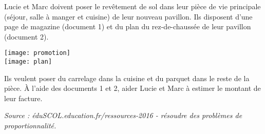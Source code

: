 \Recreation

   Lucie et Marc doivent poser le revêtement de sol dans leur pièce de vie principale (séjour, salle à manger et cuisine) de leur nouveau pavillon. Ils disposent d'une page de magazine (document 1) et du plan du rez-de-chaussée de leur pavillon (document 2).
   \begin{center}
      \texttt{[image: promotion]} \\ [5mm]
      \texttt{[image: plan]}
   \end{center}
    Ils veulent poser du carrelage dans la cuisine et du parquet dans le reste de la pièce. À l'aide des documents 1 et 2, aider Lucie et Marc à estimer le montant de leur facture.

\vfill\hfill {\it\footnotesize Source : éduSCOL.education.fr/ressources-2016 - résoudre des problèmes de proportionnalité.}

 
